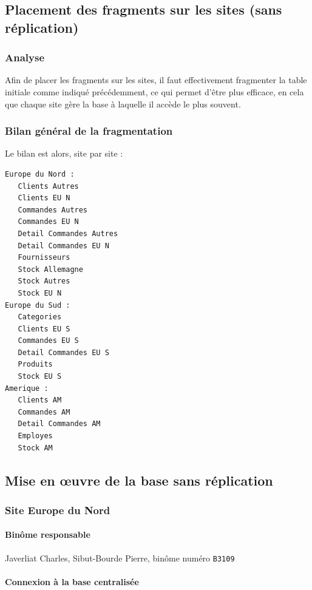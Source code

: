 \documentclass[10pt,a4paper]{article}
\theoremstyle{plain}
\begin{document}
\subsection{Placement des fragments sur les sites (sans réplication)}
\subsubsection{Analyse}
Afin de placer les fragments sur les sites, il faut effectivement fragmenter la table initiale comme indiqué précédemment, ce qui permet d'être plus efficace, en cela que chaque site gère la base à laquelle il accède le plus souvent. 

\subsubsection{Bilan général de la fragmentation}
Le bilan est alors, site par site :
\begin{verbatim}
Europe du Nord :
   Clients Autres
   Clients EU N
   Commandes Autres
   Commandes EU N
   Detail Commandes Autres
   Detail Commandes EU N
   Fournisseurs
   Stock Allemagne
   Stock Autres
   Stock EU N
Europe du Sud :
   Categories
   Clients EU S
   Commandes EU S
   Detail Commandes EU S
   Produits
   Stock EU S
Amerique :
   Clients AM
   Commandes AM
   Detail Commandes AM
   Employes
   Stock AM
\end{verbatim}

\newpage
\subsection{Mise en \oe uvre de la base sans réplication}
\subsubsection{Site Europe du Nord}

\paragraph{Binôme responsable}

Javerliat Charles, Sibut-Bourde Pierre, binôme numéro \verb|B3109|

\paragraph{Connexion à la base centralisée}

\inputminted{sql}{EUN_connexion_db_ryori.sql}
\end{document}
